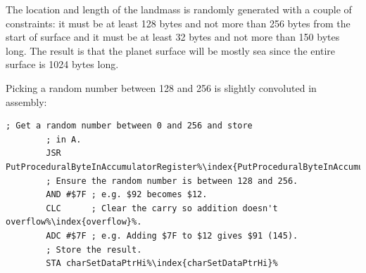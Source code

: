 The location and length of the landmass is randomly generated with a couple of constraints:
it must be at least 128 bytes  and not more than 256 bytes from the start of surface and it must be at least 32 bytes
and not more than 150 bytes long. The result is that the planet surface will be mostly sea
since the entire surface is 1024 bytes long.

Picking a random number between 128 and 256 is slightly convoluted in assembly:

\begin{lstlisting}[caption=Convoluted.,escapechar=\%]
        ; Get a random number between 0 and 256 and store
        ; in A.
        JSR PutProceduralByteInAccumulatorRegister%\index{PutProceduralByteInAccumulatorRegister}%
        ; Ensure the random number is between 128 and 256.
        AND #$7F ; e.g. $92 becomes $12.
        CLC      ; Clear the carry so addition doesn't overflow%\index{overflow}%.
        ADC #$7F ; e.g. Adding $7F to $12 gives $91 (145).
        ; Store the result.
        STA charSetDataPtrHi%\index{charSetDataPtrHi}%
\end{lstlisting}

